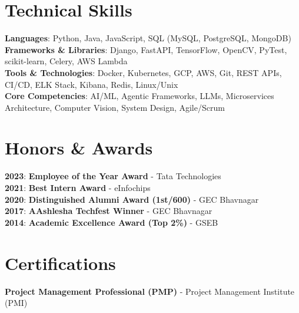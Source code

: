 \documentclass[letterpaper,10pt]{article}
\begin{document}
\section{Technical Skills}
 \begin{itemize}[leftmargin=0.015in, label={}]
    \small{\item{
     \textbf{Languages}{: Python, Java, JavaScript, SQL (MySQL, PostgreSQL, MongoDB)} \\
     \textbf{Frameworks \& Libraries}{: Django, FastAPI, TensorFlow, OpenCV, PyTest, scikit-learn, Celery, AWS Lambda} \\
     \textbf{Tools \& Technologies}{: Docker, Kubernetes, GCP, AWS, Git, REST APIs, CI/CD, ELK Stack, Kibana, Redis, Linux/Unix} \\
     \textbf{Core Competencies}{: AI/ML, Agentic Frameworks, LLMs, Microservices Architecture, Computer Vision, System Design, Agile/Scrum}
    }}
 \end{itemize}

\section{Honors \& Awards}
 \begin{itemize}[leftmargin=0.015in, label={}]
    \small{\item{
     \textbf{2023}{: \textbf{Employee of the Year Award} - Tata Technologies} \\
     \textbf{2021}{: \textbf{Best Intern Award} - eInfochips} \\
     \textbf{2020}{: \textbf{Distinguished Alumni Award (1st/600)} - GEC Bhavnagar} \\
     \textbf{2017}{: \textbf{AAshlesha Techfest Winner} - GEC Bhavnagar} \\
     \textbf{2014}{: \textbf{Academic Excellence Award (Top 2\%)} - GSEB}
    }}
 \end{itemize}

\section{Certifications}
 \begin{itemize}[leftmargin=0.015in, label={}]
    \small{\item{
     {\textbf{Project Management Professional (PMP)\textregistered} - Project Management Institute (PMI)\textregistered}
    }}
 \end{itemize}
\end{document}
